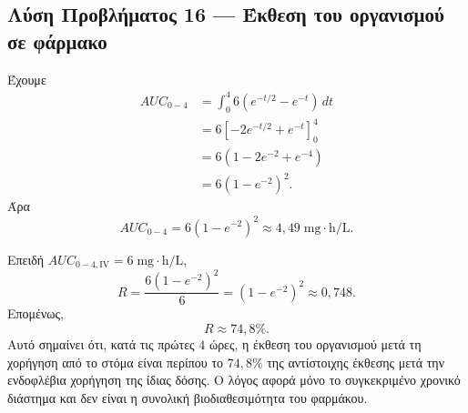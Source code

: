 \subsection*{Λύση Προβλήματος 16 --- Έκθεση του οργανισμού σε φάρμακο}

\begin{alist}
  \item Έχουμε
        \begin{align*}
          AUC_{0-4}
          &=\int_0^4 6\left(e^{-t/2}-e^{-t}\right)\,dt\\
          &=6\left[-2e^{-t/2}+e^{-t}\right]_0^4\\
          &=6\left(1-2e^{-2}+e^{-4}\right)\\
          &=6\left(1-e^{-2}\right)^2.
        \end{align*}
        Άρα
        \[
          {AUC_{0-4}
          =6\left(1-e^{-2}\right)^2
          \approx 4{,}49\;\mathrm{mg\cdot h/L}}.
        \]

  \item Επειδή $AUC_{0-4,\mathrm{IV}}=6\;\mathrm{mg\cdot h/L}$,
        \[
          R
          =\frac{6(1-e^{-2})^2}{6}
          =\left(1-e^{-2}\right)^2
          \approx 0{,}748.
        \]
        Επομένως,
        \[
          {R\approx 74{,}8\%}.
        \]
        Αυτό σημαίνει ότι, κατά τις πρώτες $4$ ώρες, η έκθεση του
        οργανισμού μετά τη χορήγηση από το στόμα είναι περίπου το
        $74{,}8\%$ της αντίστοιχης έκθεσης μετά την ενδοφλέβια
        χορήγηση της ίδιας δόσης. Ο λόγος αφορά μόνο το συγκεκριμένο
        χρονικό διάστημα και δεν είναι η συνολική βιοδιαθεσιμότητα
        του φαρμάκου.
\end{alist}
